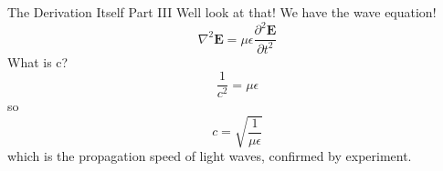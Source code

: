 \documentclass{beamer}
\begin{document}
\begin{frame}{The Derivation Itself Part III}
Well look at that! We have the wave equation!
$$\nabla^2 \textbf{E} = \mu \epsilon \frac{\partial^2 \textbf{E}}{\partial t^2}$$
What is c?
$$\frac{1}{c^2}=\mu \epsilon$$
so
$$c=\sqrt{\frac{1}{\mu \epsilon}}$$
which is the propagation speed of light waves, confirmed by experiment.
\end{frame}
\end{document}
